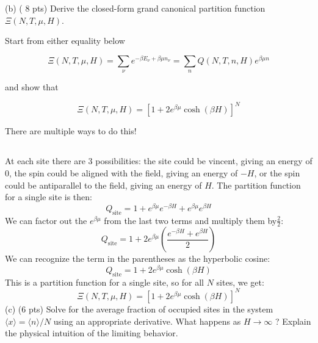 \documentclass[10pt]{article}
\begin{document}
(b) ( 8 pts) Derive the closed-form grand canonical partition function $\Xi(N, T, \mu, H)$.

Start from either equality below

$$
\Xi(N, T, \mu, H)=\sum_{\nu} e^{-\beta E_{\nu}+\beta \mu n_{\nu}}=\sum_{n} Q(N, T, n, H) e^{\beta \mu n}
$$

and show that

$$
\Xi(N, T, \mu, H)=\left[1+2 e^{\beta \mu} \cosh (\beta H)\right]^{N}
$$

There are multiple ways to do this!
\subsection{}
At each site there are 3 possibilities: the site could be vincent, giving an energy of 0, the spin could be aligned with the field, giving an energy of $-H$, or the spin could be antiparallel to the field, giving an energy of $H$. The partition function for a single site is then:
\begin{equation}
  Q_{\text{site}} = 1 + e^{\beta \mu} e^{-\beta H} + e^{\beta \mu} e^{\beta H}
\end{equation}
We can factor out the $e^{\beta \mu}$ from the last two terms and multiply them by$\frac{2}{2}$:
\begin{equation}
  Q_{\text{site}} = 1 + 2 e^{\beta \mu}\left( \frac{e^{-\beta H} + e^{\beta H}}{2} \right)
\end{equation}
We can recognize the term in the parentheses as the hyperbolic cosine:
\begin{equation}
  Q_{\text{site}} = 1 + 2 e^{\beta \mu} \cosh(\beta H)
\end{equation}
This is a partition function for a single site, so for all $N$ sites, we get:
\begin{equation}
  \Xi(N, T, \mu, H) = \left[1 + 2 e^{\beta \mu} \cosh(\beta H) \right]^N
\end{equation}
(c) (6 pts) Solve for the average fraction of occupied sites in the system $\langle x\rangle=\langle n\rangle / N$ using an appropriate derivative. What happens as $H \rightarrow \infty$ ? Explain the physical intuition of the limiting behavior.
\end{document}

